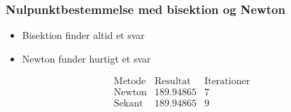 \begin{frame}
\frametitle{Nulpunktbestemmelse med bisektion og Newton}
\begin{itemize}
\item Bisektion finder altid et svar
\item Newton funder hurtigt et svar
\end{itemize}

$$\begin{array}{l|c|c}
\text{Metode} & \text{Resultat} & \text{Iterationer}\\
\hline
\text{Newton}		& 189.94865 & 7\\
\text{Sekant}		& 189.94865 & 9
\end{array}$$
\end{frame}